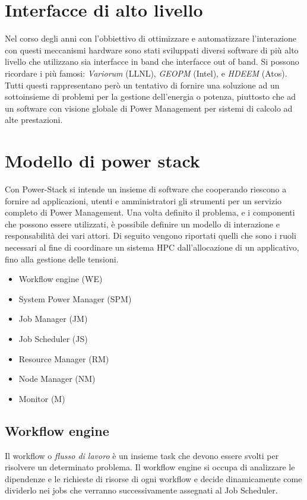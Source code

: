 \section{Interfacce di alto livello}
Nel corso degli anni con l'obbiettivo di ottimizzare e automatizzare l'interazione con questi meccanismi hardware sono stati sviluppati diversi software di più alto livello che utilizzano sia interfacce in band che interfacce out of band. Si possono ricordare i più famosi: \emph{Variorum} (LLNL), \emph{GEOPM} (Intel)\cite{GEOPM}, e \emph{HDEEM} (Atos)\cite{HDEEM}. Tutti questi rappresentano però un tentativo di fornire una soluzione ad un sottoinsieme di problemi per la gestione dell'energia o potenza, piuttosto che ad un software con visione globale di Power Management per sistemi di calcolo ad alte prestazioni. %


\section{Modello di power stack} %
Con Power-Stack si intende un insieme di software che cooperando riescono a fornire ad applicazioni, utenti e amministratori gli strumenti per un servizio completo di Power Management. Una volta definito il problema, e i componenti che possono essere utilizzati, è possibile definire un modello di interazione e responsabilità dei vari attori. Di seguito vengono riportati quelli che sono i ruoli necessari al fine di coordinare un sistema HPC dall'allocazione di un applicativo, fino alla gestione delle tensioni. 
\begin{itemize}
    \item Workflow engine (WE)
    \item System Power Manager (SPM)
    \item Job Manager (JM)
    \item Job Scheduler (JS)
    \item Resource Manager (RM)
    \item Node Manager (NM)
    \item Monitor (M)
\end{itemize}

\subsection{Workflow engine}
Il workflow o \emph{flusso di lavoro} è un insieme task che devono essere svolti per risolvere un determinato problema. Il workflow engine si occupa di analizzare le dipendenze e le richieste di risorse di ogni workflow e decide dinamicamente come dividerlo nei jobs che verranno successivamente assegnati al Job Scheduler. %

